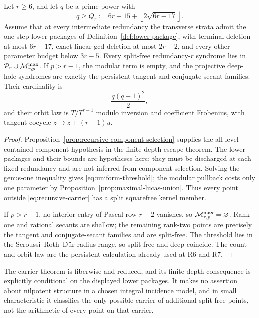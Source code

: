 \begin{theorem}
\label{thm:recursive-carrier}%
%
%
%
%
Let \(r\geq6\), and let \(q\) be a prime power with
\begin{equation}\label{eq:uniform-threshold}
 q\geq Q_r:=6r-15+\left\lfloor2\sqrt{6r-17}\right\rfloor.
\end{equation}
Assume that at every intermediate redundancy the transverse strata admit
the one-step lower packages of Definition~\ref{def:lower-package}, with
terminal deletion at most \(6r-17\), exact-linear-gcd deletion at most
\(2r-2\), and every other parameter budget below \(3r-5\).
Every split-free redundancy-\(r\) syndrome lies in
\(\mathcal P_r\cup\mathcal M^{\max}_{r,p}\).  If \(p>r-1\), the modular term is empty,
and the projective deep-hole syndromes are exactly the persistent tangent
and conjugate-secant families.  Their cardinality is
\[
                         \frac{q(q+1)^2}{2},
\]
and their orbit law is \(T/T^{r-1}\) modulo inversion and coefficient
Frobenius, with tangent cocycle \(z\mapsto z+(r-1)u\).
\end{theorem}

\begin{proof}
Proposition~\ref{prop:recursive-component-selection} supplies the
all-level contained-component hypothesis in the finite-depth escape theorem.
The lower packages and their bounds are hypotheses here; they must be
discharged at each fixed redundancy and are not inferred from component
selection.
Solving the genus-one inequality gives \eqref{eq:uniform-threshold}; the
modular pullback costs only one parameter by
Proposition~\ref{prop:maximal-lucas-union}.  Thus every point outside
\eqref{eq:recursive-carrier} has a split squarefree kernel member.

If \(p>r-1\), no interior entry of Pascal row \(r-2\) vanishes, so
\(\mathcal M^{\max}_{r,p}=\varnothing\).  Rank one and rational secants are shallow;
the remaining rank-two points are precisely the tangent and conjugate-secant
families and are split-free.  The threshold lies in the
Seroussi--Roth--Dür radius range, so split-free and deep coincide.  The count
and orbit law are the persistent calculation already used at R6 and R7.
\end{proof}

The carrier theorem is fiberwise and reduced, and its finite-depth
consequence is explicitly conditional on the displayed lower packages.  It
makes no assertion about nilpotent
structure in a chosen integral incidence model, and in small characteristic
it classifies the only possible carrier of additional split-free points, not
the arithmetic of every point on that carrier.

